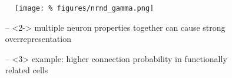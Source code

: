 \begin{frame}{}

  \begin{figure}
    \centering
    \texttt{[image: \%
      figures/nrnd\_gamma.png]} %
  \end{figure}

  \vspace{0.2cm}

  \begin{itemize}[leftmargin=1.3cm]
    \large
    \itemsep9pt
    \item[--]<2-> multiple neuron properties together can cause %
                  strong overrepresentation
    \item[--]<3> example: higher connection probability in functionally
                 \\ related cells \parencite{Lee2016a}       
  \end{itemize}

  \vspace{0.4cm}

  
\end{frame}




